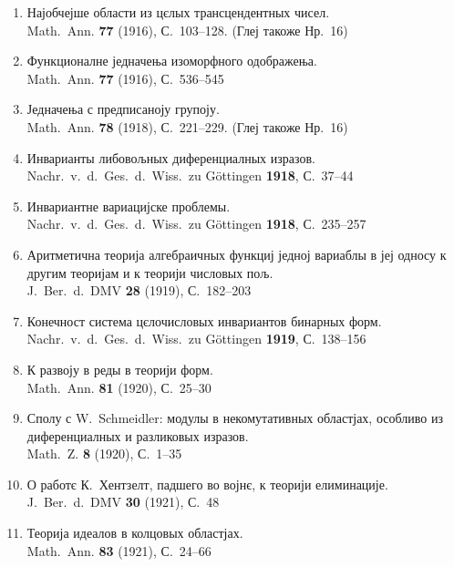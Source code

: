 \documentclass[11pt]{article}
\newcommand{\foreign}[1]{#1}
\begin{document}
\begin{enumerate}[label={\small\arabic*.},leftmargin=2em,itemsep=0.3em]
\item Најобчејше области из цєлых трансцендентных чисел.\\
\foreign{Math.\ Ann.} \textbf{77} (1916), С.~103--128. (Глеј такоже Нр.~16)

\item Функционалне једначења изоморфного одображења.\\
\foreign{Math.\ Ann.} \textbf{77} (1916), С.~536--545

\item Једначења с предписаноју групоју.\\
\foreign{Math.\ Ann.} \textbf{78} (1918), С.~221--229. (Глеј такоже Нр.~16)

\item Инварианты либовољных диференциалных изразов.\\
\foreign{Nachr.\ v.\ d.\ Ges.\ d.\ Wiss.\ zu Göttingen} \textbf{1918}, С.~37--44

\item Инвариантне вариацијске проблемы.\\
\foreign{Nachr.\ v.\ d.\ Ges.\ d.\ Wiss.\ zu Göttingen} \textbf{1918}, С.~235--257

\item Аритметична теорија алгебраичных функциј једној вариаблы в јеј односу к другим теоријам и к теорији числовых пољ.\\
\foreign{J.\ Ber.\ d.\ DMV} \textbf{28} (1919), С.~182--203

\item Конечност система цєлочисловых инвариантов бинарных форм.\\
\foreign{Nachr.\ v.\ d.\ Ges.\ d.\ Wiss.\ zu Göttingen} \textbf{1919}, С.~138--156

\item К развоју в реды в теорији форм.\\
\foreign{Math.\ Ann.} \textbf{81} (1920), С.~25--30

\item Сполу с \foreign{W.\ Schmeidler}: модулы в некомутативных областјах, особливо из диференциалных и разликовых изразов.\\
\foreign{Math.\ Z.} \textbf{8} (1920), С.~1--35

\item О работє К.\ Хентзелт, падшего во војнє, к теорији елиминације.\\
\foreign{J.\ Ber.\ d.\ DMV} \textbf{30} (1921), С.~48

\item Теорија идеалов в колцовых областјах.\\
\foreign{Math.\ Ann.} \textbf{83} (1921), С.~24--66


\end{enumerate}
\end{document}
